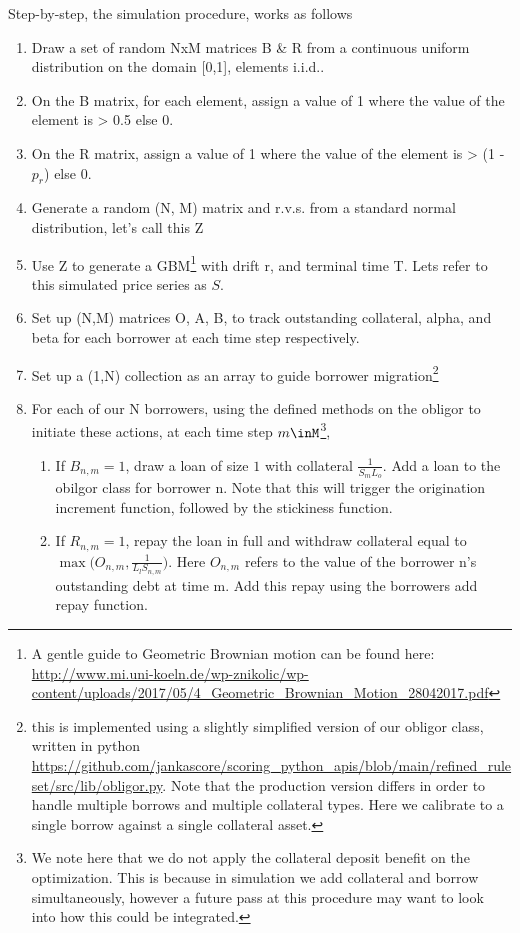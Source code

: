 \documentclass{article}
\begin{document}
Step-by-step, the simulation procedure, works as follows
\begin{enumerate}
    \item Draw a set of random NxM matrices B \& R from a continuous uniform distribution on the domain [0,1], elements i.i.d..
    \item On the B matrix, for each element, assign a value of 1 where the value of the element is > 0.5 else 0.
    \item On the R matrix, assign a value of 1 where the value of the element is > (1 - $p_r$) else 0. 
    \item Generate a random (N, M) matrix and r.v.s. from a standard normal distribution, let's call this Z
    \item Use Z to generate a GBM\footnote{A gentle guide to Geometric Brownian motion can be found here: \url{http://www.mi.uni-koeln.de/wp-znikolic/wp-content/uploads/2017/05/4\_Geometric\_Brownian\_Motion\_28042017.pdf}} with drift r, and terminal time T. Lets refer to this simulated price series as $S$.
    \item Set up (N,M) matrices O, A, B, to track outstanding collateral, alpha, and beta for each borrower at each time step respectively.
    \item Set up a (1,N) collection as an array to guide borrower migration\footnote{this is implemented using a slightly simplified version of our obligor class, written in python \url{https://github.com/jankascore/scoring\_python\_apis/blob/main/refined\_ruleset/src/lib/obligor.py}. Note that the production version differs in order to handle multiple borrows and multiple collateral types. Here we calibrate to a single borrow against a single collateral asset.}
    \item For each of our N borrowers, using the defined methods on the obligor to initiate these actions, at each time step $m\inM$\footnote{We note here that we do not apply the collateral deposit benefit on the optimization. This is because in simulation we add collateral and borrow simultaneously, however a future pass at this procedure may want to look into how this could be integrated.},
    \begin{enumerate}
        \item If $B_{n,m}=1$, draw a loan of size $1$ with collateral $\frac{1}{S_mL_o}$. Add a loan to the obilgor class for borrower n. Note that this will trigger the origination increment function, followed by the stickiness function.
        \item If $R_{n,m}=1$, repay the loan in full and withdraw collateral equal to $\max{(O_{n,m}}, \frac{1}{L_lS_{n,m}})$. Here $O_{n,m}$ refers to the value of the borrower n's outstanding debt at time m. Add this repay using the borrowers add repay function.

\end{enumerate}
\end{enumerate}
\end{document}
